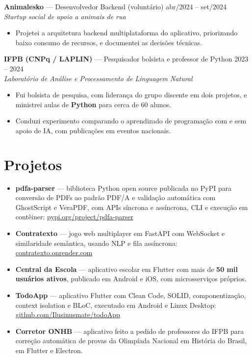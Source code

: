 \documentclass[10.5pt,a4paper]{article}
\newcommand{\cargo}[4]{%
  \Needspace*{5\baselineskip}%
  \textbf{#1} \textnormal{---} #2 \hfill \textnormal{#3}\\
  \textit{\small #4}\vspace{0.4ex}
}
\begin{document}
\cargo{Animalesko}{Desenvolvedor Backend (voluntário)}{abr/2024 -- set/2024}{Startup social de apoio
a animais de rua}
\begin{itemize}
  \item Projetei a arquitetura backend multiplataforma do aplicativo, priorizando baixo consumo de
        recursos, e documentei as decisões técnicas.
\end{itemize}

\cargo{IFPB (CNPq / LAPLIN)}{Pesquisador bolsista e professor de Python}{2023 -- 2024}{Laboratório de
Análise e Processamento de Linguagem Natural}
\begin{itemize}
  \item Fui bolsista de pesquisa, com liderança do grupo discente em dois projetos, e ministrei
        aulas de \textbf{Python} para cerca de 60 alunos.
  \item Conduzi experimento comparando o aprendizado de programação com e sem apoio de IA, com
        publicações em eventos nacionais.
\end{itemize}

\section*{Projetos}
\begin{itemize}
  \item \textbf{pdfa-parser} --- biblioteca Python open source publicada no PyPI para conversão de
        PDFs ao padrão PDF/A e validação automática com GhostScript e VeraPDF, com APIs síncrona e
        assíncrona, CLI e execução em contêiner:
        \href{https://pypi.org/project/pdfa-parser}{pypi.org/project/pdfa-parser}
  \item \textbf{Contratexto} --- jogo web multiplayer em FastAPI com WebSocket e similaridade
        semântica, usando NLP e fila assíncrona:
        \href{https://contratexto.onrender.com}{contratexto.onrender.com}
  \item \textbf{Central da Escola} --- aplicativo escolar em Flutter com mais de
        \textbf{50 mil usuários ativos}, publicado em Android e iOS, com microsserviços próprios.
  \item \textbf{TodoApp} --- aplicativo Flutter com Clean Code, SOLID, componentização, context
        isolation e BLoC, executado em Android e Linux Desktop:
        \href{https://github.com/Ilusinusmate/todoApp}{github.com/Ilusinusmate/todoApp}
  \item \textbf{Corretor ONHB} --- aplicativo feito a pedido de professores do IFPB para correção
        automática de provas da Olimpíada Nacional em História do Brasil, em Flutter e Electron.
\end{itemize}
\end{document}
